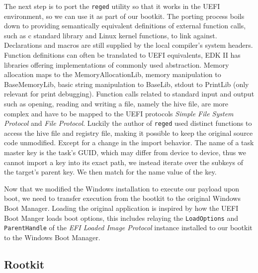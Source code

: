 The next step is to port the \lstinline{reged} utility so that it works in the UEFI environment, so we can use it as part of our bootkit.
The porting process boils down to providing semantically equivalent definitions of external function calls, such as c standard library and Linux kernel functions, to link against. Declarations and macros are still supplied by the local compiler's system headers. Function definitions can often be translated to \ac{UEFI} equivalents, \ac{EDK} II has libraries offering implementations of commonly used abstraction.
Memory allocation maps to the MemoryAllocationLib, memory manipulation to BaseMemoryLib, basic string manipulation to BaseLib, stdout to PrintLib (only relevant for print debugging).
Function calls related to standard input and output such as opening, reading and writing a file, namely the hive file, are more complex and have to be mapped to the \ac{UEFI} protocols \emph{Simple File System Protocol} and \emph{File Protocol}. Luckily the author of \lstinline{reged} used distinct functions to access the hive file and registry file, making it possible to keep the original source code unmodified.
Except for a change in the import behavior. The name of a task master key is the task's \ac{GUID}, which may differ from device to device, thus we cannot import a key into its exact path, we instead iterate over the subkeys of the target's parent key. We then match for the name value of the key.

Now that we modified the Windows installation to execute our payload upon boot, we need to transfer execution from the bootkit to the original Windows Boot Manager. Loading the original application is inspired by how the UEFI Boot Manger loads boot options, this includes relaying the \lstinline{LoadOptions} and \lstinline{ParentHandle} of the \emph{\ac{EFI} Loaded Image Protocol} \cite[9.1]{uefi-spec} instance installed to our bootkit to the Windows Boot Manager.


\subsection{Rootkit}

